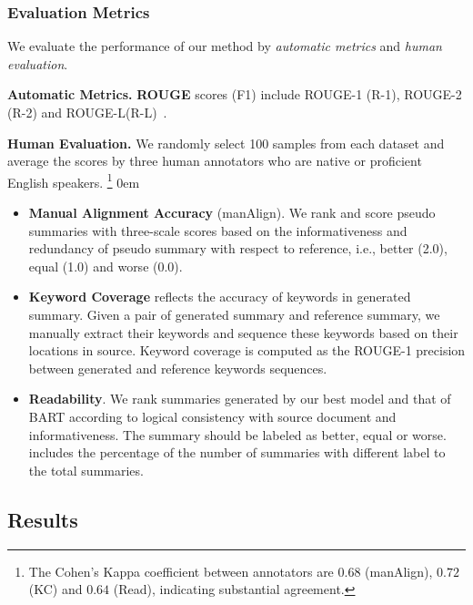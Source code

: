 \subsubsection{Evaluation Metrics}
We evaluate the performance of our method by {\em automatic metrics}
and {\em human evaluation}.

\textbf{Automatic Metrics.}
\textbf{ROUGE} scores (F1) include
ROUGE-1 (R-1), ROUGE-2 (R-2) and
ROUGE-L(R-L)~\cite{rouge}.

\textbf{Human Evaluation.}
We randomly select 100 samples from each dataset
and average the scores by three human annotators who are
native or proficient English speakers.
\footnote{
The Cohen's Kappa coefficient between annotators 
are $0.68$ (manAlign), $0.72$ (KC) and $0.64$ (Read), indicating 
substantial agreement.}
\itemsep0em
\begin{itemize}
\item 

\textbf{Manual Alignment Accuracy} (manAlign).
We rank and score pseudo summaries with three-scale scores
based on the informativeness and redundancy of pseudo summary with respect to reference,
i.e., better (2.0), equal (1.0) and worse (0.0). 

\item 
\textbf{Keyword Coverage}
reflects the accuracy of keywords in generated summary.
Given a pair of generated summary and reference summary, we manually
extract their keywords and sequence these keywords based on their locations in source. 
Keyword coverage is computed as the ROUGE-1 precision
between generated and reference keywords sequences.

\item 
\textbf{Readability}.
We rank summaries 
generated by our best model and that of
BART according to logical consistency with source document and informativeness.
The summary should be labeled as better, equal or worse.   
includes the percentage of the number of summaries 
with different label to the total summaries.
\end{itemize}


\subsection{Results}
\label{sec:results}

